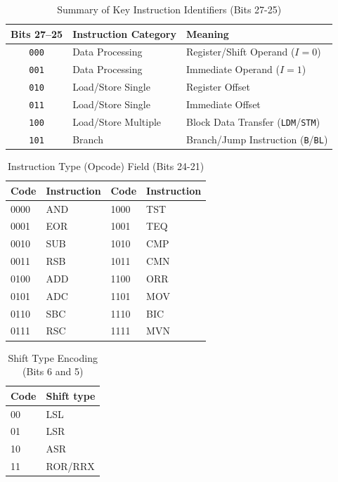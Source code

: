 \documentclass[../comorg-part1.tex]{subfiles}
\begin{document}
\begin{table}[H]
    \centering
    \caption*{Summary of Key Instruction Identifiers (Bits 27-25)}
    \begin{tabular}{c l l}
        \toprule
        \textbf{Bits 27--25} & \textbf{Instruction Category} & \textbf{Meaning} \\
        \midrule
        \texttt{000} & Data Processing & Register/Shift Operand ($I=0$) \\
        \texttt{001} & Data Processing & Immediate Operand ($I=1$) \\
        \texttt{010} & Load/Store Single & Register Offset \\
        \texttt{011} & Load/Store Single & Immediate Offset \\
        \texttt{100} & Load/Store Multiple & Block Data Transfer (\texttt{LDM}/\texttt{STM}) \\
        \texttt{101} & Branch              & Branch/Jump Instruction (\texttt{B}/\texttt{BL}) \\
        \bottomrule
    \end{tabular}
\end{table}

\begin{table}[H]
    \centering
    \caption*{Instruction Type (Opcode) Field (Bits 24-21)}
    \begin{tabular}{ll@{\qquad}ll}
        \toprule
        \textbf{Code} & \textbf{Instruction} & \textbf{Code} & \textbf{Instruction} \\
        \midrule
        0000 & AND & 1000 & TST \\
        0001 & EOR & 1001 & TEQ \\
        0010 & SUB & 1010 & CMP \\
        0011 & RSB & 1011 & CMN \\
        0100 & ADD & 1100 & ORR \\
        0101 & ADC & 1101 & MOV \\
        0110 & SBC & 1110 & BIC \\
        0111 & RSC & 1111 & MVN \\
        \bottomrule
    \end{tabular}
\end{table}

\begin{table}[H]
    \centering
    \caption*{Shift Type Encoding (Bits 6 and 5)}
    \begin{tabular}{ll}
        \toprule
        \textbf{Code} & \textbf{Shift type} \\
        \midrule
        00 & LSL \\
        01 & LSR \\
        10 & ASR \\
        11 & ROR/RRX \\
        \bottomrule
    \end{tabular}
\end{table}
\end{document}
